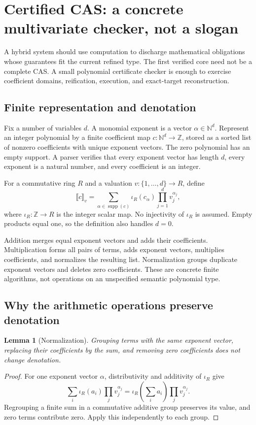 \documentclass[11pt,a4paper]{article}
\newcommand{\Z}{\mathbb Z}\newcommand{\N}{\mathbb N}
\newcommand{\eval}[1]{\llbracket #1\rrbracket}
\theoremstyle{plain}
\newtheorem{lemma}[proposition]{Lemma}
\theoremstyle{definition}
\theoremstyle{remark}
\begin{document}
\section{Certified CAS: a concrete multivariate checker, not a slogan}
\label{sec:cas}
A hybrid system should use computation to discharge mathematical obligations
whose guarantees fit the current refined type. The first verified core need
not be a complete CAS. A small polynomial certificate checker is enough to
exercise coefficient domains, reification, execution, and exact-target
reconstruction.

\subsection{Finite representation and denotation}
Fix a number of variables $d$. A monomial exponent is a vector
$\alpha\in\N^d$. Represent an integer polynomial by a finite coefficient map
$c:\N^d\to\Z$, stored as a sorted list of nonzero coefficients with unique
exponent vectors. The zero polynomial has an empty support. A parser verifies
that every exponent vector has length $d$, every exponent is a natural number,
and every coefficient is an integer.

For a commutative ring $R$ and a valuation $v:\{1,\ldots,d\}\to R$, define
\[
 \eval c_v=\sum_{\alpha\in\operatorname{supp}(c)}
      \iota_R(c_\alpha)\prod_{j=1}^{d}v_j^{\alpha_j},
\]
where $\iota_R:\Z\to R$ is the integer scalar map. No injectivity of
$\iota_R$ is assumed. Empty products equal one, so the definition also handles
$d=0$.

Addition merges equal exponent vectors and adds their coefficients.
Multiplication forms all pairs of terms, adds exponent vectors, multiplies
coefficients, and normalizes the resulting list. Normalization groups duplicate
exponent vectors and deletes zero coefficients. These are concrete finite
algorithms, not operations on an unspecified semantic polynomial type.

\subsection{Why the arithmetic operations preserve denotation}
\begin{lemma}[Normalization]
Grouping terms with the same exponent vector, replacing their coefficients by
the sum, and removing zero coefficients does not change denotation.
\end{lemma}
\begin{proof}
For one exponent vector $\alpha$, distributivity and additivity of $\iota_R$
give
\[
 \sum_i\iota_R(a_i)\prod_jv_j^{\alpha_j}
 =\iota_R\!\left(\sum_i a_i\right)\prod_jv_j^{\alpha_j}.
\]
Regrouping a finite sum in a commutative additive group preserves its value,
and zero terms contribute zero. Apply this independently to each group.
\end{proof}
\end{document}
